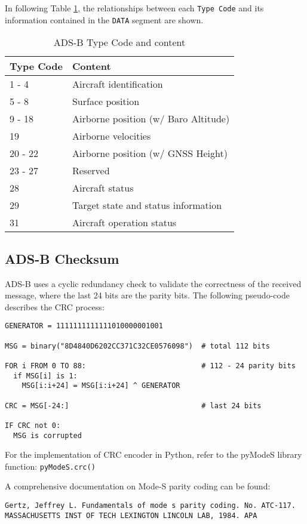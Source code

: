 In following Table \ref{tb:adsb-tc}, the relationships between each \texttt{Type\ Code} and its information contained in the \texttt{DATA} segment are shown.

\begin{table}[!ht]
\centering
\begin{tabular}{@{}ll@{}}
\toprule
Type Code & Content                              \\ \midrule
1 - 4     & Aircraft identification              \\
5 - 8     & Surface position                     \\
9 - 18    & Airborne position (w/ Baro Altitude) \\
19        & Airborne velocities                  \\
20 - 22   & Airborne position (w/ GNSS Height)   \\
23 - 27   & Reserved                             \\
28        & Aircraft status                      \\
29        & Target state and status information  \\
31        & Aircraft operation status            \\ \bottomrule
\end{tabular}
\caption{ADS-B Type Code and content}
\label{tb:adsb-tc}
\end{table}

\subsection{ADS-B Checksum}\label{ads-b-checksum}

ADS-B uses a cyclic redundancy check to validate the correctness of the received message, where the last 24 bits are the parity bits. The following pseudo-code describes the CRC process:

\begin{verbatim}
GENERATOR = 1111111111111010000001001

MSG = binary("8D4840D6202CC371C32CE0576098")  # total 112 bits

FOR i FROM 0 TO 88:                           # 112 - 24 parity bits
  if MSG[i] is 1:
    MSG[i:i+24] = MSG[i:i+24] ^ GENERATOR

CRC = MSG[-24:]                               # last 24 bits

IF CRC not 0:
  MSG is corrupted

\end{verbatim}

For the implementation of CRC encoder in Python, refer to the pyModeS library function: \texttt{pyModeS.crc()}

A comprehensive documentation on Mode-S parity coding can be found:

\begin{verbatim}
Gertz, Jeffrey L. Fundamentals of mode s parity coding. No. ATC-117.
MASSACHUSETTS INST OF TECH LEXINGTON LINCOLN LAB, 1984. APA
\end{verbatim}
